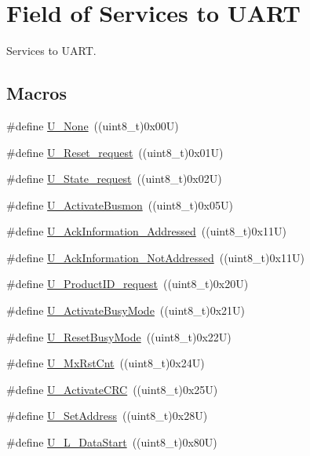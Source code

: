 \hypertarget{group___u_a_r_t___control___to}{}\section{Field of Services to U\+A\+RT}
\label{group___u_a_r_t___control___to}


Services to U\+A\+RT.  


\subsection*{Macros}
\begin{DoxyCompactItemize}
\item 
\#define \hyperlink{group___u_a_r_t___control___to_ga30eddf5dc99c172d71df52a3a9c466bc}{U\+\_\+\+None}~((uint8\+\_\+t)0x00\+U)
\item 
\#define \hyperlink{group___u_a_r_t___control___to_gab4e4e9acfc0b14566dee580c784d43c5}{U\+\_\+\+Reset\+\_\+request}~((uint8\+\_\+t)0x01\+U)
\item 
\#define \hyperlink{group___u_a_r_t___control___to_ga8dda3117e8869a900e5c5fe6f1b3a768}{U\+\_\+\+State\+\_\+request}~((uint8\+\_\+t)0x02\+U)
\item 
\#define \hyperlink{group___u_a_r_t___control___to_ga08302041c8622699abb02954c7942d33}{U\+\_\+\+Activate\+Busmon}~((uint8\+\_\+t)0x05\+U)
\item 
\#define \hyperlink{group___u_a_r_t___control___to_gadbcf1715439a76db9d5a416c772b7d6a}{U\+\_\+\+Ack\+Information\+\_\+\+Addressed}~((uint8\+\_\+t)0x11\+U)
\item 
\#define \hyperlink{group___u_a_r_t___control___to_gaa58e8b87e2c7afa233dc9143f9ed3000}{U\+\_\+\+Ack\+Information\+\_\+\+Not\+Addressed}~((uint8\+\_\+t)0x11\+U)
\item 
\#define \hyperlink{group___u_a_r_t___control___to_ga0fd706c07225b8d94a9e61178e9f1de2}{U\+\_\+\+Product\+I\+D\+\_\+request}~((uint8\+\_\+t)0x20\+U)
\item 
\#define \hyperlink{group___u_a_r_t___control___to_ga570dbcb6f3b58812795897e653cf6bcd}{U\+\_\+\+Activate\+Busy\+Mode}~((uint8\+\_\+t)0x21\+U)
\item 
\#define \hyperlink{group___u_a_r_t___control___to_gadddb4434f9a2e47ed320bc3bd39eec0c}{U\+\_\+\+Reset\+Busy\+Mode}~((uint8\+\_\+t)0x22\+U)
\item 
\#define \hyperlink{group___u_a_r_t___control___to_ga8898cd82315a21d0365c60b05a9450f9}{U\+\_\+\+Mx\+Rst\+Cnt}~((uint8\+\_\+t)0x24\+U)
\item 
\#define \hyperlink{group___u_a_r_t___control___to_gaa8801c2c6b23ad1b63c85b6f04b08c6d}{U\+\_\+\+Activate\+C\+RC}~((uint8\+\_\+t)0x25\+U)
\item 
\#define \hyperlink{group___u_a_r_t___control___to_ga1b727950a6079fa1f299e08204ad8923}{U\+\_\+\+Set\+Address}~((uint8\+\_\+t)0x28\+U)
\item 
\#define \hyperlink{group___u_a_r_t___control___to_ga5a6fadacef419bffab0a2ad00d4a4a3a}{U\+\_\+\+L\+\_\+\+Data\+Start}~((uint8\+\_\+t)0x80\+U)
\end{DoxyCompactItemize}


